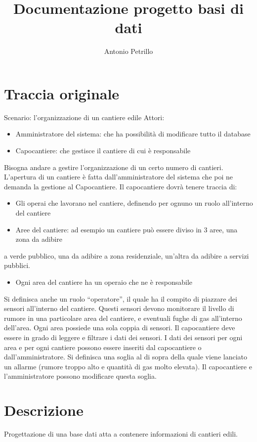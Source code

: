 \documentclass[11pt]{article}
\author{Antonio Petrillo}
\date{}
\title{Documentazione progetto basi di dati}
\begin{document}
\maketitle
\setcounter{tocdepth}{2}
\tableofcontents

\section*{Traccia originale}
\label{sec:org8ab949f}
Scenario: l’organizzazione di un cantiere edile Attori:
\begin{itemize}
\item Amministratore del sistema: che ha possibilità di modificare tutto il database
\item Capocantiere: che gestisce il cantiere di cui è responsabile
\end{itemize}
Bisogna andare a gestire l’organizzazione di un certo numero di cantieri. L’apertura di un cantiere è fatta dall’amministratore del sistema che poi ne demanda la gestione al Capocantiere.
Il capocantiere dovrà tenere traccia di:
\begin{itemize}
\item Gli operai che lavorano nel cantiere, definendo per ognuno un ruolo all’interno del cantiere
\item Aree del cantiere: ad esempio un cantiere può essere diviso in 3 aree, una zona da adibire
\end{itemize}
a verde pubblico, una da adibire a zona residenziale, un’altra da adibire a servizi pubblici.
\begin{itemize}
\item Ogni area del cantiere ha un operaio che ne è responsabile
\end{itemize}
Si definisca anche un ruolo “operatore”, il quale ha il compito di piazzare dei sensori all’interno del cantiere. Questi sensori devono monitorare il livello di rumore in una particolare area del cantiere, e eventuali fughe di gas all’interno dell’area. Ogni area possiede una sola coppia di sensori.
Il capocantiere deve essere in grado di leggere e filtrare i dati dei sensori. I dati dei sensori per ogni area e per ogni cantiere possono essere inseriti dal capocantiere o dall’amministratore. Si definisca una soglia al di sopra della quale viene lanciato un allarme (rumore troppo alto e quantità di gas molto elevata). Il capocantiere e l’amministratore possono modificare questa soglia.
\section*{Descrizione}
\label{sec:orgae0d11a}
Progettazione di una base dati atta a contenere informazioni di cantieri edili.
\end{document}
